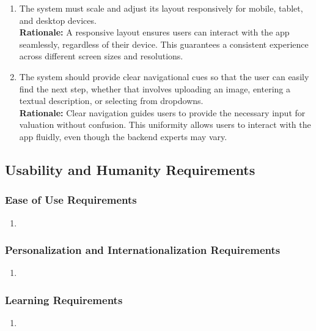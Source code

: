 \documentclass[]{article}
\begin{document}
\begin{enumerate}
\begin{enumerate}[{LF-S}1.]
    \item  The system must scale and adjust its layout responsively for mobile, tablet, and desktop devices.  \\
    \textbf{Rationale:} A responsive layout ensures users can interact with the app seamlessly, regardless of their device. This guarantees a consistent experience across different screen sizes and resolutions.

    \item The system should provide clear navigational cues so that the user can easily find the next step, whether that involves uploading an image, entering a textual description, or selecting from dropdowns.  \\
    \textbf{Rationale:} Clear navigation guides users to provide the necessary input for valuation without confusion. This uniformity allows users to interact with the app fluidly, even though the backend experts may vary.
\end{enumerate}

\subsection{Usability and Humanity Requirements}
\label{sub:usability_and_humanity_requirements}

\subsubsection{Ease of Use Requirements}
\label{ssub:ease_of_use_requirements}
\begin{enumerate}[{UH-EOU}1. ]
	\item 
\end{enumerate}

\subsubsection{Personalization and Internationalization Requirements}
\label{ssub:personalization_and_internationalization_requirements}
\begin{enumerate}[{UH-PI}1. ]
	\item 
\end{enumerate}

\subsubsection{Learning Requirements}
\label{ssub:learning_requirements}
\begin{enumerate}[{UH-L}1. ]
	\item 
\end{enumerate}


\end{enumerate}
\end{document}
